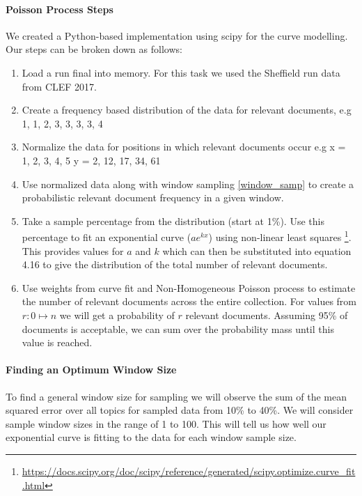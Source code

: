 \paragraph{Poisson Process Steps} \label{pp_steps}

We created a Python-based implementation using scipy for the curve modelling. Our steps can be broken down as follows:

\begin{enumerate}
\item Load a run final into memory. For this task we used the Sheffield run data from CLEF 2017.

\item Create a frequency based distribution of the data for relevant documents, e.g 1, 1, 2, 3, 3, 3, 3, 4

\item Normalize the data for positions in which relevant documents occur e.g x = 1, 2, 3, 4, 5 y = 2, 12, 17, 34, 61

\item Use normalized data along with window sampling \ref{window_samp} to create a probabilistic relevant document frequency in a given window. 

\item Take a sample percentage from the distribution (start at 1\%). Use this percentage to fit an exponential curve ($ae^{kx}$) using non-linear least squares \footnote{\url{https://docs.scipy.org/doc/scipy/reference/generated/scipy.optimize.curve_fit.html}}. This provides values for $a$ and $k$ which can then be substituted into equation 4.16 to give the distribution of the total number of relevant documents.

\item Use weights from curve fit and Non-Homogeneous Poisson process to estimate the number of relevant documents across the entire collection. For values from $r: 0 \mapsto n$ we will get a probability of $r$ relevant documents. Assuming 95\% of documents is acceptable, we can sum over the probability mass until this value is reached.

\end{enumerate}

\paragraph{Finding an Optimum Window Size} \label{pp_steps}

To find a general window size for sampling we will observe the sum of the mean squared error over all topics for sampled data from 10\% to 40\%. We will consider sample window sizes in the range of 1 to 100.  This will tell us how well our exponential curve is fitting to the data for each window sample size.

